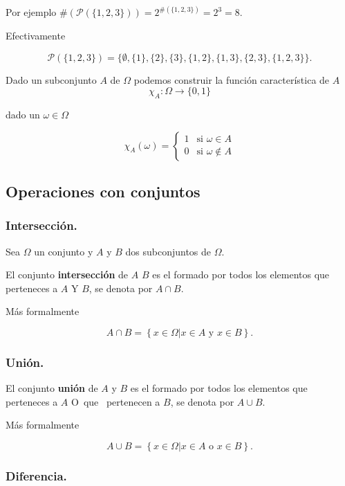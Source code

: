 \documentclass[]{book}
\begin{document}
Por ejemplo \(\#\left(\mathcal{P}(\{1,2,3\})\right)=2^{\#(\{1,2,3\})}=2^3=8.\)

Efectivamente

\[\mathcal{P}(\{1,2,3\})=\{\emptyset,\{1\},\{2\},\{3\},\{1,2\},\{1,3\},\{2,3\},\{1,2,3\}\}.\]

Dado un subconjunto \(A\) de \(\Omega\) podemos construir la función característica de \(A\)
\[\chi_A:\Omega \to \{0,1\}\]

dado un \(\omega\in \Omega\)

\[
\chi_A(\omega)=
\left\{
\begin{array}{ll}
1 &  \mbox{si }\omega \in A\\
0 &  \mbox{si }\omega \not\in A
\end{array}
\right.
\]

\hypertarget{operaciones-con-conjuntos}{%
\subsection{Operaciones con conjuntos}\label{operaciones-con-conjuntos}}

\hypertarget{intersecciuxf3n.}{%
\subsubsection{Intersección.}\label{intersecciuxf3n.}}

Sea \(\Omega\) un conjunto y \(A\) y \(B\) dos subconjuntos de \(\Omega\).

El conjunto \textbf{intersección} de \(A\) \(B\) es el formado por todos los elementos que perteneces a \(A\) \mbox{Y} \(B\), se denota por \(A\cap B\).

Más formalmente

\[
A\cap B=\left\{x\in\Omega \big| x\in A \mbox{ y } x\in B\right\}.
\]

\hypertarget{uniuxf3n.}{%
\subsubsection{Unión.}\label{uniuxf3n.}}

El conjunto \textbf{unión} de \(A\) y \(B\) es el formado por todos los elementos que perteneces a \(A\) \mbox{O que } pertenecen a \(B\), se denota por \(A\cup B\).

Más formalmente

\[
A\cup B=\left\{x\in\Omega \big| x\in A \mbox{ o } x\in B\right\}.
\]

\hypertarget{diferencia.}{%
\subsubsection{Diferencia.}\label{diferencia.}}
\end{document}
